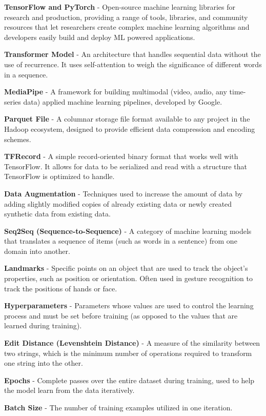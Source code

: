 \documentclass[preprint,11pt,review,authoryear]{elsarticle}
\begin{document}
\textbf{TensorFlow and PyTorch} - Open-source machine learning libraries for research and production, providing a range of tools, libraries, and community resources that let researchers create complex machine learning algorithms and developers easily build and deploy ML powered applications.

\textbf{Transformer Model} - An architecture that handles sequential data without the use of recurrence. It uses self-attention to weigh the significance of different words in a sequence.

\textbf{MediaPipe} - A framework for building multimodal (video, audio, any time-series data) applied machine learning pipelines, developed by Google.

\textbf{Parquet File} - A columnar storage file format available to any project in the Hadoop ecosystem, designed to provide efficient data compression and encoding schemes.

\textbf{TFRecord} - A simple record-oriented binary format that works well with TensorFlow. It allows for data to be serialized and read with a structure that TensorFlow is optimized to handle.

\textbf{Data Augmentation} - Techniques used to increase the amount of data by adding slightly modified copies of already existing data or newly created synthetic data from existing data.

\textbf{Seq2Seq (Sequence-to-Sequence)} - A category of machine learning models that translates a sequence of items (such as words in a sentence) from one domain into another.

\textbf{Landmarks} - Specific points on an object that are used to track the object's properties, such as position or orientation. Often used in gesture recognition to track the positions of hands or face.

\textbf{Hyperparameters} - Parameters whose values are used to control the learning process and must be set before training (as opposed to the values that are learned during training).

\textbf{Edit Distance (Levenshtein Distance)} - A measure of the similarity between two strings, which is the minimum number of operations required to transform one string into the other.

\textbf{Epochs} - Complete passes over the entire dataset during training, used to help the model learn from the data iteratively.

\textbf{Batch Size} - The number of training examples utilized in one iteration.
\end{document}

